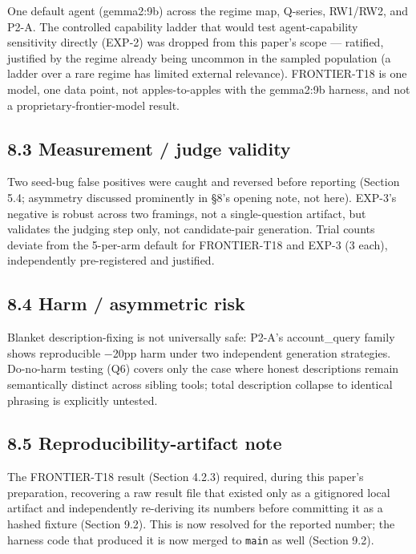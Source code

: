 One default agent (gemma2:9b) across the regime map, Q-series, RW1/RW2,
and P2-A. The controlled capability ladder that would test
agent-capability sensitivity directly (EXP-2) was dropped from this
paper's scope --- ratified, justified by the regime already being
uncommon in the sampled population (a ladder over a rare regime has
limited external relevance). FRONTIER-T18 is one model, one data point,
not apples-to-apples with the gemma2:9b harness, and not a
proprietary-frontier-model result.

\hypertarget{measurement-judge-validity}{%
\subsection{8.3 Measurement / judge
validity}\label{measurement-judge-validity}}

Two seed-bug false positives were caught and reversed before reporting
(Section 5.4; asymmetry discussed prominently in §8's opening note, not here).
EXP-3's negative is robust across two framings, not a single-question
artifact, but validates the judging step only, not candidate-pair
generation. Trial counts deviate from the 5-per-arm default for
FRONTIER-T18 and EXP-3 (3 each), independently pre-registered and
justified.

\hypertarget{harm-asymmetric-risk}{%
\subsection{8.4 Harm / asymmetric risk}\label{harm-asymmetric-risk}}

Blanket description-fixing is not universally safe: P2-A's
account\_query family shows reproducible −20pp harm under two
independent generation strategies. Do-no-harm testing (Q6) covers only
the case where honest descriptions remain semantically distinct across
sibling tools; total description collapse to identical phrasing is
explicitly untested.

\hypertarget{reproducibility-artifact-note}{%
\subsection{8.5 Reproducibility-artifact
note}\label{reproducibility-artifact-note}}

The FRONTIER-T18 result (Section 4.2.3) required, during this paper's
preparation, recovering a raw result file that existed only as a
gitignored local artifact and independently re-deriving its numbers
before committing it as a hashed fixture (Section 9.2). This is now
resolved for the reported number; the harness code that produced it
is now merged to \texttt{main} as well (Section 9.2).

